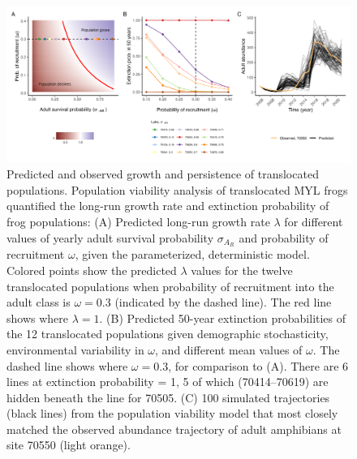 \documentclass[9pt,twocolumn,twoside,lineno]{pnas-new}
\begin{document}
\begin{figure}

{\centering \includegraphics[width=\textwidth]{figures/pop_viability_figures_for_manuscript.jpg}

}

\caption{\label{fig-viability}Predicted and observed growth and
persistence of translocated populations. Population viability analysis
of translocated MYL frogs quantified the long-run growth rate and
extinction probability of frog populations: (A) Predicted long-run
growth rate \(\lambda\) for different values of yearly adult survival
probability \(\sigma_{A_R}\) and probability of recruitment \(\omega\),
given the parameterized, deterministic model. Colored points show the
predicted \(\lambda\) values for the twelve translocated populations
when probability of recruitment into the adult class is \(\omega = 0.3\)
(indicated by the dashed line). The red line shows where
\(\lambda = 1\). (B) Predicted 50-year extinction probabilities of the
12 translocated populations given demographic stochasticity,
environmental variability in \(\omega\), and different mean values of
\(\omega\). The dashed line shows where \(\omega = 0.3\), for comparison
to (A). There are 6 lines at extinction probability = 1, 5 of which
(70414--70619) are hidden beneath the line for 70505. (C) 100 simulated
trajectories (black lines) from the population viability model that most
closely matched the observed abundance trajectory of adult amphibians at
site 70550 (light orange).}

\end{figure}

\newpage
\end{document}
